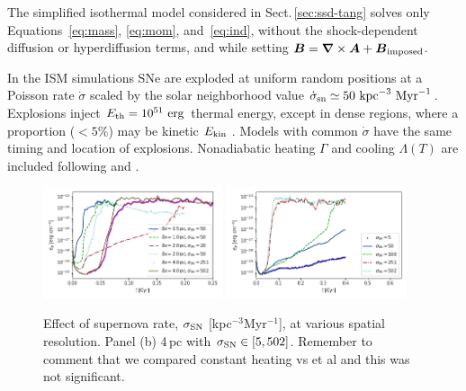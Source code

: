 \documentclass[preprint2]{aastex63}
\newcommand\SNr{\dot\sigma_{\rm sn}}
\newcommand\ESK{E_{\rm kin}}
\newcommand\EST{E_{\rm th}}
\newcommand{\vect}[1]{{{\mbox{\boldmath $#1$}}}}%
\newcommand\kpc{~ {\rm kpc}}
\newcommand\Myr{~ {\rm Myr}}
\newcommand\erg{~ {\rm erg}}
\begin{document}
 The simplified isothermal model considered in
Sect.\,\ref{sec:ssd-tang} solves only Equations~\eqref{eq:mass},
 \eqref{eq:mom}, and~\eqref{eq:ind}, without the shock-dependent diffusion or
 hyperdiffusion terms, and while setting
 $\vect{B}=\vect\nabla\times\vect{A}+\vect{B}_{\rm imposed}$.

 {In the ISM simulations} SNe are exploded at {uniform} random positions
 at a Poisson rate $\dot\sigma$ {scaled by} the solar neighborhood
 value $\SNr\simeq 50\kpc^{-3}\Myr^{-1}$.
 Explosions inject $\EST = 10^{51}\erg$ thermal energy, except in
 dense regions, where a proportion ($<5\%$) may be kinetic $\ESK$ 
 \citep[see][]{GMKSH20}.
 {Models with common $\dot\sigma$ have the same timing and location of
 explosions.}
 Nonadiabatic heating $\Gamma$ and cooling $\Lambda (T)$ are included
 \citep{Gent:2013b} following \citet{Wolfire:1995} and \citet{Sarazin:1987}.

\begin{figure}
\centering
\includegraphics[trim=0.0cm 0.0cm 0.0cm 0.0cm,clip=true,width=0.47\textwidth]{csc_figs/sn_dx.png}
\includegraphics[trim=0.0cm 0.0cm 0.0cm 0.0cm,clip=true,width=0.47\textwidth]{csc_figs/sn4pc.png}
\caption{
Effect of supernova rate, $\sigma_{\rm SN}$ [kpc$^{-3}$Myr$^{-1}$], at various
spatial resolution. Panel (b) 4\,pc with $\sigma_{\rm SN} \in[5,502]$.
{Remember to comment that we compared constant heating vs \citet{Wolfire:1995} et al and this was not significant.}
\label{fig:brms_SNrate}
}
\end{figure}
\end{document}
